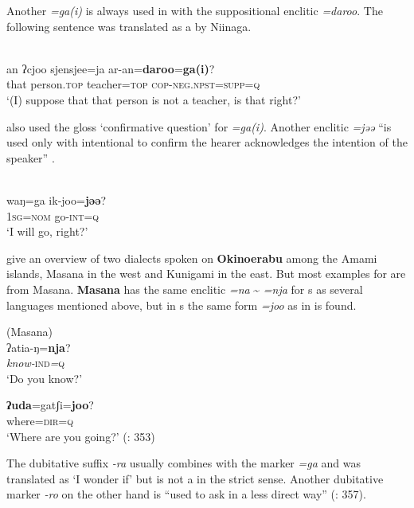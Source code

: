 Another  \textit{=ga(i)} is always used in  with the suppositional enclitic \textit{=daroo}. The following sentence was translated as a  by Niinaga.

\ea%
    \label{ex:japa:21}
    \\
    \gll an ʔcjoo sjensjee=ja ar-an=\textbf{{daroo}}=\textbf{{ga(i)}}?\\
    that  person.\textsc{top}  teacher=\textsc{top}  \textsc{cop}-\textsc{neg}.\textsc{npst}=\textsc{supp}=\textsc{q}\\
    \glt ‘(I) suppose that that person is not a teacher, is that right?’ \citep[73]{Niinaga2010}
    \z

\citet[72]{Niinaga2010} also used the gloss ‘confirmative question’ for \textit{=ga(i)}. Another enclitic \textit{=jəə} “is used only with intentional  to confirm the hearer acknowledges the intention of the speaker” \citep[72]{Niinaga2010}.

\ea%
    \label{ex:japa:22}
    \\
    \gll waŋ=ga  ik-joo=\textbf{{jəə}}?\\
    1\textsc{sg}=\textsc{nom}  go-\textsc{int}=\textsc{q}\\
    \glt ‘I will go, right?’ \citep[329]{Niinaga2015}
    \z

 give an overview of two dialects spoken on \textbf{Okinoerabu} among the Amami islands, Masana in the west and Kunigami in the east. But most examples for  are from Masana. \textbf{Masana} has the same enclitic \textit{=na} {\textasciitilde} \textit{=nja} for s as several languages mentioned above, but in s the same form \textit{=joo} as in  is found.

\ea%
    \label{ex:japa:23}
     (Masana)\\
    \ea
    \gll ʔatia-ŋ=\textbf{{nja}}?\\
    \textit{know-}\textsc{ind}\textit{=}\textsc{q}\\
    \glt ‘Do you know?’
    
    \ex
    \gll \textbf{{ʔuda}}{=gatʃi=}\textbf{{joo}}?\\
    where=\textsc{dir}=\textsc{q}\\
    \glt ‘Where are you going?’ (\citealt{vanderLubbeTokunaga2015}: 353)
    \z
    \z

\noindent The dubitative suffix \textit{-ra} usually combines with the  marker \textit{=ga} and was translated as ‘I wonder if’ but is not a  in the strict sense. Another dubitative marker \textit{-ro} on the other hand is “used to ask  in a less direct way” (\citealt{vanderLubbeTokunaga2015}: 357).

